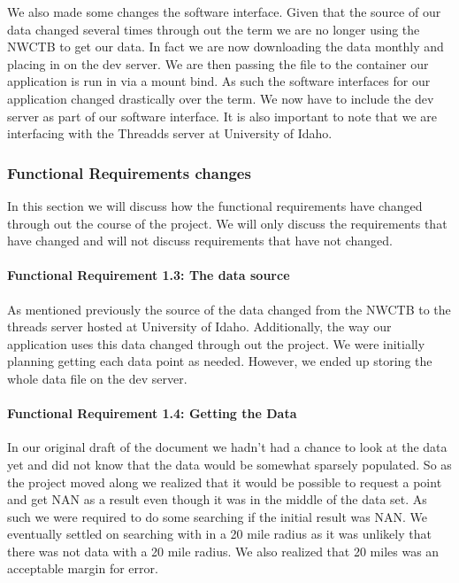 \documentclass[onecolumn, draftclsnofoot,10pt, compsoc]{article}
\begin{document}
        We also made some changes the software interface. Given that the source of our data changed several times through out the term we are no longer using the NWCTB to get our data. In fact we are now downloading the data monthly and placing in on the dev server. We are then passing the file to the container our application is run in via a mount bind. As such the software interfaces for our application changed drastically over the term. We now have to include the dev server as part of our software interface. It is also important to note that we are interfacing with the Threadds server at University of Idaho.\\

        \subsubsection{Functional Requirements changes}
            In this section we will discuss how the functional requirements have changed through out the course of the project. We will only discuss the requirements that have changed and will not discuss requirements that have not changed.\\

		    \paragraph{Functional Requirement 1.3: The data source}
		    As mentioned previously the source of the data changed from the NWCTB to the threads server hosted at University of Idaho. Additionally, the way our application uses this data changed through out the project. We were initially planning getting each data point as needed. However, we ended up storing the whole data file on the dev server.\\

		    \paragraph{Functional Requirement 1.4: Getting the Data}
		    In our original draft of the document we hadn't had a chance to look at the data yet and did not know that the data would be somewhat sparsely populated. So as the project moved along we realized that it would be possible to request a point and get NAN as a result even though it was in the middle of the data set. As such we were required to do some searching if the initial result was NAN. We eventually settled on searching with in a 20 mile radius as it was unlikely that there was not data with a 20 mile radius. We also realized that 20 miles was an acceptable margin for error.\\
\end{document}
